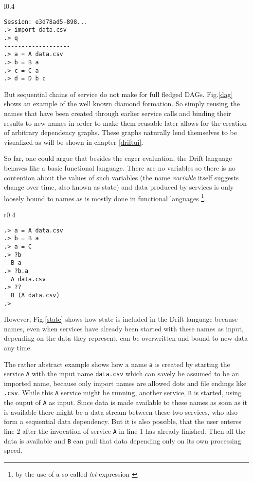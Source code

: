 \begin{wrapfigure}{l}{0.4\textwidth}
  \begin{lstlisting}
Session: e3d78ad5-898...
.> import data.csv
.> q
-------------------
.> a = A data.csv
.> b = B a
.> c = C a
.> d = D b c
  \end{lstlisting}
  \caption{Example showing how to construct dependency graphs.}
  \label{dag}
\end{wrapfigure}

But sequential chains of service do not make for full fledged
DAGs. Fig.\ref{dag} shows an example of the well known
diamond formation. So simply reusing the names that have
been created through earlier service calls and binding their
results to new names in order to make them reusable later allows
for the creation of arbitrary dependency graphs.
These graphs naturally lend themselves to be visualized as will
be shown in chapter \ref{driftui}.

So far, one could argue that besides the eager evaluation,
the Drift language behaves like a basic functional language.
There are no variables so there is no contention about the values
of such variables (the name \textit{variable} itself suggests
change over time, also known as state) and data produced by services
is only loosely bound to names as is mostly done in functional languages
\footnote{by the use of a so called \textit{let}-expression \cite{let}}.

\begin{wrapfigure}{r}{0.4\textwidth}
  \begin{lstlisting}
.> a = A data.csv
.> b = B a
.> a = C
.> ?b
  B a
.> ?b.a
  A data.csv
.> ??
  B (A data.csv)
.>
  \end{lstlisting}
  \caption{Example showing state in the language and how service
           invocations behave as closures.}
  \label{state}
\end{wrapfigure}

However, Fig.\ref{state} shows how state is included in the Drift
language because names, even when services have already been started
with these names as input, depending on the data they represent,
can be overwritten and bound to new data any time.

The rather abstract example shows how a name \texttt{a} is created
by starting the service \texttt{A} with the input name \texttt{data.csv}
which can savely be assumed to be an imported name, because only import
names are allowed dots and file endings like \texttt{.csv}.
While this \texttt{A} service might be running, another service,
\texttt{B} is started, using the ouput of \texttt{A} as input.
Since data is made available to these names as soon as it is available
there might be a data stream between these two services, who also
form a sequential data dependency. But it is also possible, that the
user enteres line 2 after the invocation of service \texttt{A} in line
1 has already finished. Then all the data is available and \texttt{B}
can pull that data depending only on its own processing speed.

